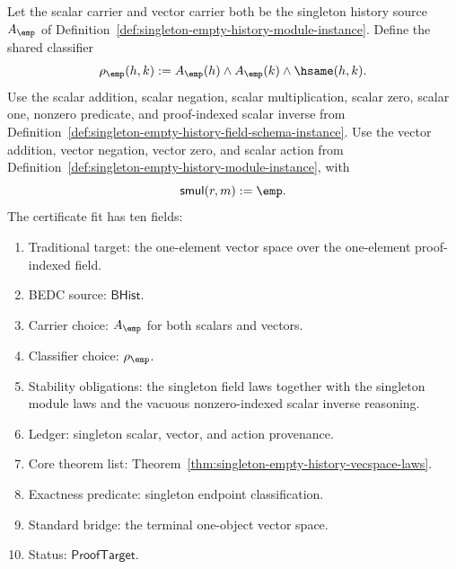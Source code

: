 \begin{definition}
\label{def:singleton-empty-history-vecspace-instance}
Let the scalar carrier and vector carrier both be the singleton history source
$A_{\emp}$ of Definition~\ref{def:singleton-empty-history-module-instance}.
Define the shared classifier
$$
\rho_{\emp}(h,k):=
A_{\emp}(h)\land A_{\emp}(k)\land\hsame(h,k).
$$
Use the scalar addition, scalar negation, scalar multiplication, scalar zero,
scalar one, nonzero predicate, and proof-indexed scalar inverse from
Definition~\ref{def:singleton-empty-history-field-schema-instance}. Use the
vector addition, vector negation, vector zero, and scalar action from
Definition~\ref{def:singleton-empty-history-module-instance}, with
$$
\mathsf{smul}(r,m):=\emp.
$$
The certificate fit has ten fields:
\begin{enumerate}
  \item Traditional target: the one-element vector space over the one-element
  proof-indexed field.
  \item BEDC source: $\mathsf{BHist}$.
  \item Carrier choice: $A_{\emp}$ for both scalars and vectors.
  \item Classifier choice: $\rho_{\emp}$.
  \item Stability obligations: the singleton field laws together with the
  singleton module laws and the vacuous nonzero-indexed scalar inverse
  reasoning.
  \item Ledger: singleton scalar, vector, and action provenance.
  \item Core theorem list: Theorem~\ref{thm:singleton-empty-history-vecspace-laws}.
  \item Exactness predicate: singleton endpoint classification.
  \item Standard bridge: the terminal one-object vector space.
  \item Status: $\mathsf{ProofTarget}$.
\end{enumerate}
\end{definition}

